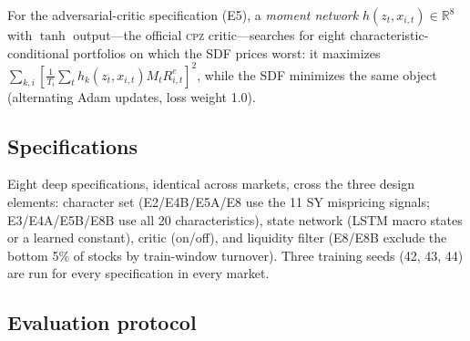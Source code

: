 \documentclass[12pt]{article}
\begin{document}
For the adversarial-critic specification (E5), a \emph{moment network} $h(z_t,x_{i,t})\in\mathbb{R}^8$ with $\tanh$ output---the official \textsc{cpz} critic---searches for eight characteristic-conditional portfolios on which the SDF prices worst: it maximizes $\sum_{k,i} [\frac{1}{T_i}\sum_t h_k(z_t,x_{i,t}) M_t R^e_{i,t}]^2$, while the SDF minimizes the same object (alternating Adam updates, loss weight 1.0).

\subsection{Specifications}

Eight deep specifications, identical across markets, cross the three design elements: character set (E2/E4B/E5A/E8 use the 11 SY mispricing signals; E3/E4A/E5B/E8B use all 20 characteristics), state network (LSTM macro states or a learned constant), critic (on/off), and liquidity filter (E8/E8B exclude the bottom 5\% of stocks by train-window turnover). Three training seeds (42, 43, 44) are run for every specification in every market.

\subsection{Evaluation protocol}
\end{document}
